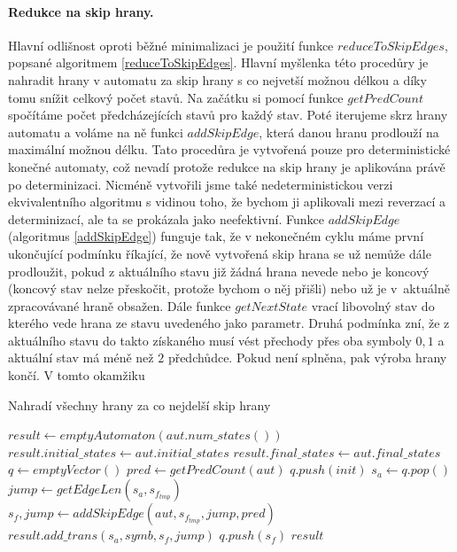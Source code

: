 \paragraph{Redukce na skip hrany.} Hlavní odlišnost oproti běžné minimalizaci je použití funkce $reduceToSkipEdges$, popsané algoritmem \ref{reduceToSkipEdges}. Hlavní myšlenka této procedůry je nahradit hrany v automatu za skip hrany s co nejvetší možnou délkou a díky tomu snížit celkový počet stavů. Na začátku si pomocí funkce $getPredCount$ spočítáme počet předcházejících stavů pro každý stav. Poté iterujeme skrz hrany automatu a voláme na ně funkci $addSkipEdge$, která danou hranu prodlouží na maximální možnou délku. Tato procedůra je vytvořená pouze pro deterministické konečné automaty, což nevadí protože redukce na skip hrany je aplikována právě po determinizaci. Nicméně vytvořili jsme také nedeterministickou verzi ekvivalentního algoritmu s vidinou toho, že bychom ji aplikovali mezi reverzací a determinizací, ale ta se prokázala jako neefektivní. Funkce $addSkipEdge$ (algoritmus \ref{addSkipEdge}) funguje tak, že v nekonečném cyklu máme první ukončující podmínku říkající, že nově vytvořená skip hrana se už nemůže dále prodloužit, pokud z aktuálního stavu již žádná hrana nevede nebo je koncový (koncový stav nelze přeskočit, protože bychom o něj přišli) nebo už je v~aktuálně zpracovávané hraně obsažen. Dále funkce $getNextState$ vrací libovolný stav do kterého vede hrana ze stavu uvedeného jako parametr. Druhá podmínka zní, že z aktuálního stavu do takto získaného musí vést přechody přes oba symboly $0,1$ a aktuální stav má méně než $2$ předchůdce. Pokud není splněna, pak výroba hrany končí. V tomto okamžiku

\begin{algorithm}
    \caption{Nahradí všechny hrany za co nejdelší skip hrany}
    \label{reduceToSkipEdges}
        \begin{algorithmic}[1]
                \State $result \gets emptyAutomaton(aut.num\_states())$
                \State $result.initial\_states \gets aut.initial\_states$
                \State $result.final\_states \gets aut.final\_states$
                \State $q \gets emptyVector()$
                \State $pred \gets getPredCount(aut)$
                    \State $q.push(init)$
                \EndFor
                    \State $s_a \gets q.pop()$
                        \State $jump \gets getEdgeLen(s_a,s_{f_{tmp}})$
                        \State $s_f,jump \gets addSkipEdge(aut, s_{f_{tmp}}, jump, pred)$
                        \State $result.add\_trans(s_a, symb, s_f, jump)$
                            \State $q.push(s_f)$
                        \EndIf
                    \EndFor
                \EndWhile
                \State \Return $result$
            \EndProcedure
        \end{algorithmic}
\end{algorithm}

